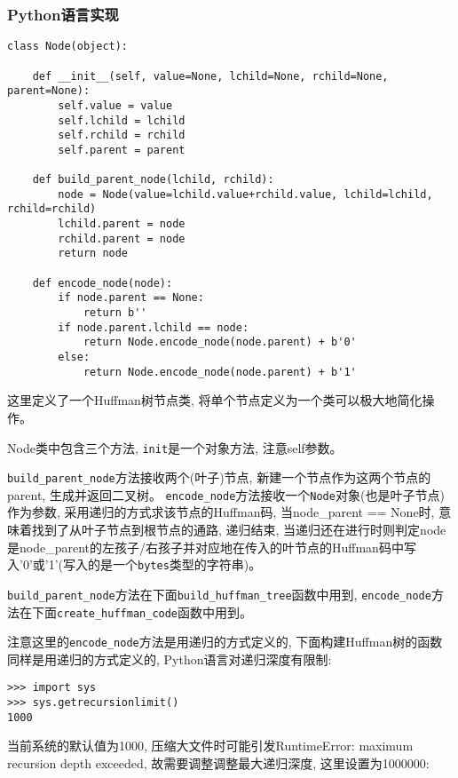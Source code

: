 \documentclass[a4paper]{ctexart}
\begin{document}
\subsubsection{Python语言实现}\label{header-n290}

{\setmainfont{Courier New Bold}              
\begin{lstlisting}
class Node(object):

    def __init__(self, value=None, lchild=None, rchild=None, parent=None):
        self.value = value
        self.lchild = lchild
        self.rchild = rchild
        self.parent = parent

    def build_parent_node(lchild, rchild):
        node = Node(value=lchild.value+rchild.value, lchild=lchild, rchild=rchild)
        lchild.parent = node
        rchild.parent = node
        return node

    def encode_node(node):
        if node.parent == None:
            return b''
        if node.parent.lchild == node:
            return Node.encode_node(node.parent) + b'0'
        else:
            return Node.encode_node(node.parent) + b'1'
\end{lstlisting}}

这里定义了一个Huffman树节点类, 将单个节点定义为一个类可以极大地简化操作。

Node类中包含三个方法, \texttt{init}是一个对象方法, 注意self参数。

\texttt{build\_parent\_node}方法接收两个(叶子)节点, 新建一个节点作为这两个节点的parent, 生成并返回二叉树。
\texttt{encode\_node}方法接收一个\texttt{Node}对象(也是叶子节点)作为参数, 采用递归的方式求该节点的Huffman码, 当node\_parent == None时, 意味着找到了从叶子节点到根节点的通路, 递归结束, 当递归还在进行时则判定node是node\_parent的左孩子/右孩子并对应地在传入的叶节点的Huffman码中写入'0'或'1'(写入的是一个\texttt{bytes}类型的字符串)。

\texttt{build\_parent\_node}方法在下面\texttt{build\_huffman\_tree}函数中用到, \texttt{encode\_node}方法在下面\texttt{create\_huffman\_code}函数中用到。

注意这里的\texttt{encode\_node}方法是用递归的方式定义的, 下面构建Huffman树的函数同样是用递归的方式定义的, Python语言对递归深度有限制:

{\setmainfont{Courier New Bold}              
\begin{lstlisting}
>>> import sys
>>> sys.getrecursionlimit()
1000
\end{lstlisting}}

当前系统的默认值为1000, 压缩大文件时可能引发RuntimeError: maximum recursion depth exceeded, 故需要调整调整最大递归深度, 这里设置为1000000:
\end{document}
